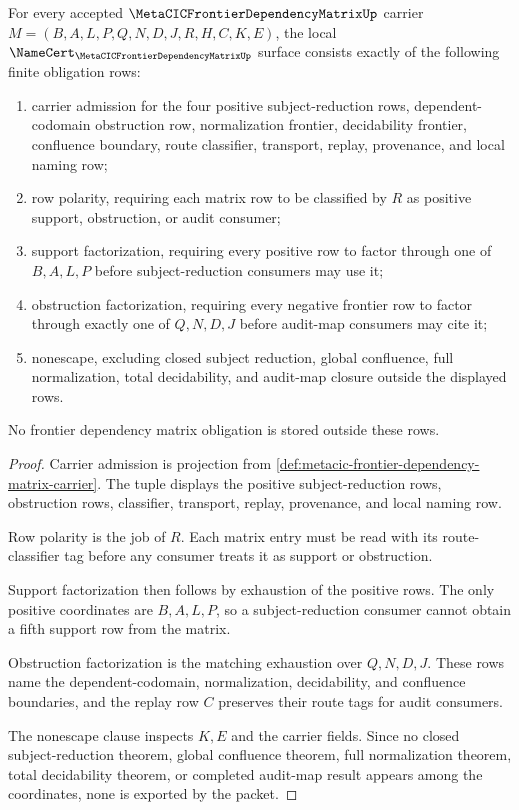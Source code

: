 \begin{theorem}
\label{thm:metacic-frontier-dependency-matrix-obligations}
For every accepted $\MetaCICFrontierDependencyMatrixUp$ carrier $M=(B,A,L,P,Q,N,D,J,R,H,C,K,E)$, the local $\NameCert_{\MetaCICFrontierDependencyMatrixUp}$ surface consists exactly of the following finite obligation rows:
\begin{enumerate}
\item carrier admission for the four positive subject-reduction rows, dependent-codomain obstruction row, normalization frontier, decidability frontier, confluence boundary, route classifier, transport, replay, provenance, and local naming row;
\item row polarity, requiring each matrix row to be classified by $R$ as positive support, obstruction, or audit consumer;
\item support factorization, requiring every positive row to factor through one of $B,A,L,P$ before subject-reduction consumers may use it;
\item obstruction factorization, requiring every negative frontier row to factor through exactly one of $Q,N,D,J$ before audit-map consumers may cite it;
\item nonescape, excluding closed subject reduction, global confluence, full normalization, total decidability, and audit-map closure outside the displayed rows.
\end{enumerate}
No frontier dependency matrix obligation is stored outside these rows.
\end{theorem}
\begin{proof}
Carrier admission is projection from \autoref{def:metacic-frontier-dependency-matrix-carrier}. The tuple displays the positive subject-reduction rows, obstruction rows, classifier, transport, replay, provenance, and local naming row.

Row polarity is the job of $R$. Each matrix entry must be read with its route-classifier tag before any consumer treats it as support or obstruction.

Support factorization then follows by exhaustion of the positive rows. The only positive coordinates are $B,A,L,P$, so a subject-reduction consumer cannot obtain a fifth support row from the matrix.

Obstruction factorization is the matching exhaustion over $Q,N,D,J$. These rows name the dependent-codomain, normalization, decidability, and confluence boundaries, and the replay row $C$ preserves their route tags for audit consumers.

The nonescape clause inspects $K,E$ and the carrier fields. Since no closed subject-reduction theorem, global confluence theorem, full normalization theorem, total decidability theorem, or completed audit-map result appears among the coordinates, none is exported by the packet.
\end{proof}

